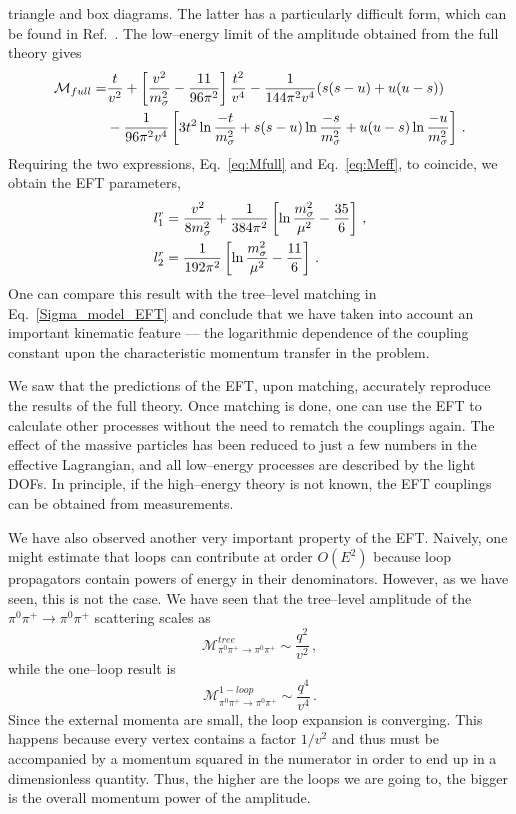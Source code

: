 \documentclass[12pt]{article}
\newcommand{\be}{\begin{equation}}
\newcommand{\ee}{\end{equation}}
\newcommand\s{\sigma}
\renewcommand{\ln}{\mathop{\rm ln}\nolimits}
\begin{document}
triangle and box diagrams. The latter has a particularly difficult form, which can be found in Ref.~\cite{Denner:2010tr}. The low--energy limit of the amplitude obtained from the full theory gives
\be
\label{eq:Mfull}
\begin{split}
\mathcal{M}_{full}=&\frac{t}{v^2}+\left[\frac{v^2}{m_\sigma^2 }-\frac{11}{96 \pi^2}\right]\frac{t^2}{v^4}-\frac{1}{144\pi^2 v^4}(s(s-u)+u(u-s))\\
&-\frac{1}{96 \pi^2 v^4}\left[3t^2\ln\frac{-t}{m_\s^2}+s(s-u)\ln\frac{-s}{m_\s^2}+u(u-s)\ln\frac{-u}{m_\s^2}\right]\,.
\end{split}
\ee
Requiring the two expressions, Eq.~\eqref{eq:Mfull} and Eq.~\eqref{eq:Meff}, to coincide, we obtain
the EFT parameters,
\be
\begin{split}
&l_1^r=\frac{v^2}{8m_\s^2}+\frac{1}{384\pi^2}\left[\ln \frac{m_\s^2}{\mu^2}-\frac{35}{6}\right]\,,\\
&l_2^r=\frac{1}{192\pi^2}\left[\ln \frac{m_\s^2}{\mu^2}-\frac{11}{6}\right]\,.
\end{split}
\ee
One can compare this result with the tree--level matching in Eq.~\eqref{Sigma_model_EFT}
and conclude that we have taken into account an important kinematic feature --- the logarithmic
dependence of the coupling constant upon the characteristic momentum transfer in the problem.

We saw that the predictions of the EFT, upon matching, accurately
reproduce the results of the full theory. Once matching is done, one can use the EFT to
calculate other processes without the need to rematch the couplings again.
The effect of the massive particles has been reduced to just a few numbers in the effective
Lagrangian, and all low--energy processes are described by the light DOFs.
In principle, if the high--energy theory is not known, the EFT couplings can be obtained
from measurements.

We have also observed another very important property of the EFT. Naively, one
might estimate that loops can contribute at order $O(E^2)$ because loop propagators contain
powers of energy in their denominators. However, as we have seen, this is not the case.
We have seen that the tree--level amplitude of the $\pi^0\pi^+\to \pi^0\pi^+$ scattering
scales as
\be
\mathcal{M}^{tree}_{\pi^0\pi^+\to \pi^0\pi^+} \sim \frac{q^2}{v^2}\,,
\ee
while the one--loop result is
\be
\mathcal{M}^{1-loop}_{\pi^0\pi^+\to \pi^0\pi^+} \sim \frac{q^4}{v^4}\,.
\ee
Since the external momenta are small, the loop expansion is converging.
This happens because every vertex contains a factor $1/v^2$ and thus must be
accompanied by a momentum squared in the numerator in order to end up in a dimensionless quantity.
Thus, the higher are the loops we are going to, the bigger is the overall momentum power
of the amplitude.
\end{document}
